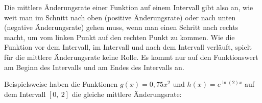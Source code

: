\bigskip

\begin{minipage}{\textwidth}
\end{minipage}

\bigskip

Die mittlere Änderungsrate einer Funktion auf einem Intervall gibt also an, wie weit man im Schnitt nach oben (positive Änderungsrate) oder nach unten (negative Änderungsrate) gehen muss, wenn man einen Schritt nach rechts macht, um vom linken Punkt auf den rechten Punkt zu kommen. Wie die Funktion vor dem Intervall, im Intervall und nach dem Intervall verläuft, spielt für die mittlere Änderungsrate keine Rolle. Es kommt nur auf den Funktionswert am Beginn des Intervalls und am Endes des Intervalls an.

Beispielsweise haben die Funktionen \(g(x)=0,75x^2\) und \(h(x)=e^{\ln(2)x}\) auf dem Intervall \([0,\ 2]\) die gleiche mittlere Änderungsrate:

